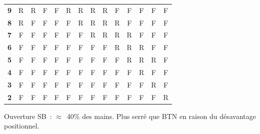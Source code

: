 \documentclass[a4paper,11pt]{article}
\begin{document}
\begin{table}[H]
\begin{tabular}{c|*{13}{c}}
\textbf{9} & \cellcolor{raise!15}R & \cellcolor{raise!10}R & \cellcolor{fold!20}F & \cellcolor{fold!20}F & \cellcolor{raise!10}R & \cellcolor{raise!25}R & \cellcolor{raise!15}R & \cellcolor{raise!10}R & \cellcolor{fold!20}F & \cellcolor{fold!20}F & \cellcolor{fold!20}F & \cellcolor{fold!20}F & \cellcolor{fold!20}F \\
\textbf{8} & \cellcolor{raise!10}R & \cellcolor{fold!20}F & \cellcolor{fold!20}F & \cellcolor{fold!20}F & \cellcolor{fold!20}F & \cellcolor{raise!10}R & \cellcolor{raise!25}R & \cellcolor{raise!10}R & \cellcolor{raise!10}R & \cellcolor{fold!20}F & \cellcolor{fold!20}F & \cellcolor{fold!20}F & \cellcolor{fold!20}F \\
\textbf{7} & \cellcolor{fold!20}F & \cellcolor{fold!20}F & \cellcolor{fold!20}F & \cellcolor{fold!20}F & \cellcolor{fold!20}F & \cellcolor{fold!20}F & \cellcolor{raise!10}R & \cellcolor{raise!20}R & \cellcolor{raise!10}R & \cellcolor{raise!10}R & \cellcolor{fold!20}F & \cellcolor{fold!20}F & \cellcolor{fold!20}F \\
\textbf{6} & \cellcolor{fold!20}F & \cellcolor{fold!20}F & \cellcolor{fold!20}F & \cellcolor{fold!20}F & \cellcolor{fold!20}F & \cellcolor{fold!20}F & \cellcolor{fold!20}F & \cellcolor{fold!20}F & \cellcolor{raise!20}R & \cellcolor{raise!10}R & \cellcolor{raise!10}R & \cellcolor{fold!20}F & \cellcolor{fold!20}F \\
\textbf{5} & \cellcolor{fold!20}F & \cellcolor{fold!20}F & \cellcolor{fold!20}F & \cellcolor{fold!20}F & \cellcolor{fold!20}F & \cellcolor{fold!20}F & \cellcolor{fold!20}F & \cellcolor{fold!20}F & \cellcolor{fold!20}F & \cellcolor{raise!20}R & \cellcolor{raise!10}R & \cellcolor{raise!10}R & \cellcolor{fold!20}F \\
\textbf{4} & \cellcolor{fold!20}F & \cellcolor{fold!20}F & \cellcolor{fold!20}F & \cellcolor{fold!20}F & \cellcolor{fold!20}F & \cellcolor{fold!20}F & \cellcolor{fold!20}F & \cellcolor{fold!20}F & \cellcolor{fold!20}F & \cellcolor{fold!20}F & \cellcolor{raise!15}R & \cellcolor{fold!20}F & \cellcolor{fold!20}F \\
\textbf{3} & \cellcolor{fold!20}F & \cellcolor{fold!20}F & \cellcolor{fold!20}F & \cellcolor{fold!20}F & \cellcolor{fold!20}F & \cellcolor{fold!20}F & \cellcolor{fold!20}F & \cellcolor{fold!20}F & \cellcolor{fold!20}F & \cellcolor{fold!20}F & \cellcolor{fold!20}F & \cellcolor{raise!15}R & \cellcolor{fold!20}F \\
\textbf{2} & \cellcolor{fold!20}F & \cellcolor{fold!20}F & \cellcolor{fold!20}F & \cellcolor{fold!20}F & \cellcolor{fold!20}F & \cellcolor{fold!20}F & \cellcolor{fold!20}F & \cellcolor{fold!20}F & \cellcolor{fold!20}F & \cellcolor{fold!20}F & \cellcolor{fold!20}F & \cellcolor{fold!20}F & \cellcolor{raise!15}R \\
\bottomrule
\end{tabular}

\medskip
\footnotesize
Ouverture SB~: $\approx$~40\% des mains. Plus serr\'e que BTN en raison du d\'esavantage positionnel.
\end{table}
\end{document}
